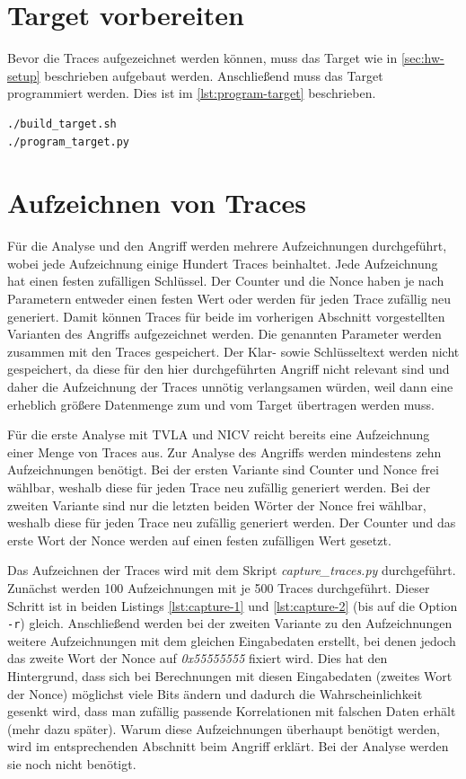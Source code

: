 \documentclass[a4paper,ngerman]{scrreprt}
\begin{document}
\section{Target vorbereiten}

Bevor die Traces aufgezeichnet werden können, muss das Target wie in
\autoref{sec:hw-setup} beschrieben aufgebaut werden. Anschließend muss das
Target programmiert werden. Dies ist im \autoref{lst:program-target}
beschrieben.

\begin{lstlisting}[language=bash, caption={Target programmieren}, label=lst:program-target]
./build_target.sh
./program_target.py
\end{lstlisting}


\section{Aufzeichnen von Traces}

Für die Analyse und den Angriff werden mehrere Aufzeichnungen durchgeführt,
wobei jede Aufzeichnung einige Hundert Traces beinhaltet. Jede Aufzeichnung hat
einen festen zufälligen Schlüssel. Der Counter und die Nonce haben je nach
Parametern entweder einen festen Wert oder werden für jeden Trace zufällig neu
generiert. Damit können Traces für beide im vorherigen Abschnitt vorgestellten
Varianten des Angriffs aufgezeichnet werden. Die genannten Parameter werden
zusammen mit den Traces gespeichert. Der Klar- sowie Schlüsseltext werden nicht
gespeichert, da diese für den hier durchgeführten Angriff nicht relevant sind
und daher die Aufzeichnung der Traces unnötig verlangsamen würden, weil dann
eine erheblich größere Datenmenge zum und vom Target übertragen werden muss.

Für die erste Analyse mit TVLA und NICV reicht bereits eine Aufzeichnung einer
Menge von Traces aus. Zur Analyse des Angriffs werden mindestens zehn
Aufzeichnungen benötigt. Bei der ersten Variante sind Counter und Nonce frei
wählbar, weshalb diese für jeden Trace neu zufällig generiert werden. Bei der
zweiten Variante sind nur die letzten beiden Wörter der Nonce frei wählbar,
weshalb diese für jeden Trace neu zufällig generiert werden. Der Counter und das
erste Wort der Nonce werden auf einen festen zufälligen Wert gesetzt.

Das Aufzeichnen der Traces wird mit dem Skript \emph{capture\_traces.py}
durchgeführt. Zunächst werden 100 Aufzeichnungen mit je 500 Traces durchgeführt.
Dieser Schritt ist in beiden Listings \autoref{lst:capture-1} und
\autoref{lst:capture-2} (bis auf die Option \verb+-r+) gleich. Anschließend
werden bei der zweiten Variante zu den Aufzeichnungen weitere Aufzeichnungen mit
dem gleichen Eingabedaten erstellt, bei denen jedoch das zweite Wort der Nonce
auf \emph{0x55555555} fixiert wird. Dies hat den Hintergrund, dass sich bei
Berechnungen mit diesen Eingabedaten (zweites Wort der Nonce) möglichst viele
Bits ändern und dadurch die Wahrscheinlichkeit gesenkt wird, dass man zufällig
passende Korrelationen mit falschen Daten erhält (mehr dazu später). Warum diese
Aufzeichnungen überhaupt benötigt werden, wird im entsprechenden Abschnitt beim
Angriff erklärt. Bei der Analyse werden sie noch nicht benötigt.
\end{document}
